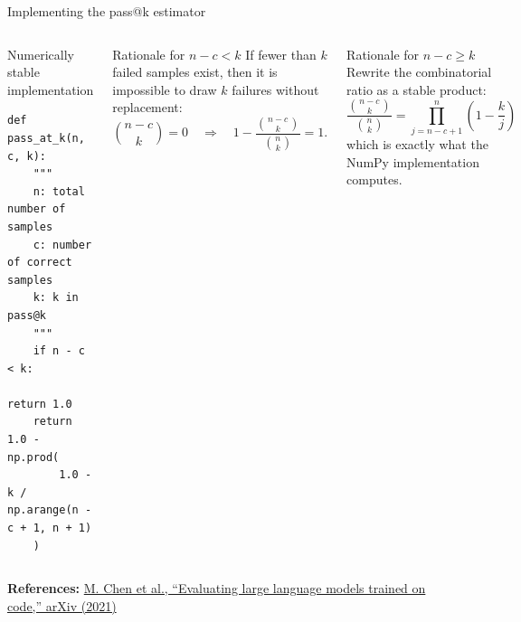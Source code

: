 \documentclass[aspectratio=43,9pt]{beamer}
\newcommand{\srclink}[2]{\href{#2}{\textcolor{black!68}{#1}}}
\newcommand{\refline}[2][References]{%
  \vfill
  {\raggedright\fontsize{5.1}{5.5}\selectfont\color{black!68}\textbf{#1:} #2\par}%
}
\newcommand{\srcChen}{\srclink{M. Chen et al., ``Evaluating large language models trained on code,'' arXiv (2021)}{https://arxiv.org/abs/2107.03374}}
\begin{document}
\begin{frame}[fragile]{Implementing the pass@k estimator}
\scriptsize
\begin{columns}[T,totalwidth=\textwidth]
\begin{block}{Numerically stable implementation}
\begin{lstlisting}
def pass_at_k(n, c, k):
    """
    n: total number of samples
    c: number of correct samples
    k: k in pass@k
    """
    if n - c < k:
        return 1.0
    return 1.0 - np.prod(
        1.0 - k / np.arange(n - c + 1, n + 1)
    )
\end{lstlisting}
\end{block}

\begin{block}{Rationale for \(n-c < k\)}
If fewer than \(k\) failed samples exist, then it is impossible to draw \(k\) failures without replacement:
\[
\binom{n-c}{k}=0
\quad\Rightarrow\quad
1 - \frac{\binom{n-c}{k}}{\binom{n}{k}} = 1.
\]
\end{block}

\begin{exampleblock}{Rationale for \(n-c \ge k\)}
Rewrite the combinatorial ratio as a stable product:
\[
\frac{\binom{n-c}{k}}{\binom{n}{k}}
= \prod_{j=n-c+1}^{n}\left(1-\frac{k}{j}\right)
\]
which is exactly what the NumPy implementation computes.
\end{exampleblock}
\end{columns}

\refline{\srcChen}
\end{frame}
\end{document}
